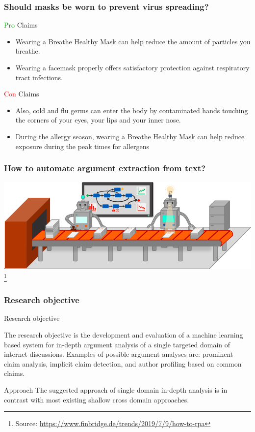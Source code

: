\documentclass{beamer}
\newcommand{\pro}[1]{\textcolor{green}{#1}}
\newcommand{\con}[1]{\textcolor{red}{#1}}
\begin{document}
\begin{frame}
\frametitle{Should masks be worn to prevent virus spreading?}
\begin{block}{\pro{Pro} Claims}
\begin{itemize}
	\item Wearing a Breathe Healthy Mask can help reduce the amount of particles you breathe.
	\item Wearing a facemask properly offers satisfactory protection against respiratory tract infections.
\end{itemize}
\end{block}

\begin{block}{\con{Con} Claims}
\begin{itemize}
	\item Also, cold and flu germs can enter the body by contaminated hands touching the corners of your eyes, your lips and your inner nose.
	\item During the allergy season, wearing a Breathe Healthy Mask can help reduce exposure during the peak times for allergens
\end{itemize}
\end{block}

\end{frame}

\begin{frame}
\frametitle{How to automate argument extraction from text?}
\includegraphics[scale=0.3]{assembly_line.png}
\footnote{
\tiny{Source: \url{https://www.finbridge.de/trends/2019/7/9/how-to-rpa}}}
\end{frame}

\begin{frame}
	\frametitle{Research objective}
	\begin{block}{Research objective}
		
The research objective is the development and evaluation of a machine learning
based system for in-depth argument analysis of a single targeted domain of
internet discussions. Examples of possible argument analyses are: prominent
claim analysis, implicit claim detection, and author profiling based on common claims. 
\end{block}

\begin{block}{Approach}
The suggested approach of single domain in-depth analysis is in contrast
with most existing shallow cross domain approaches. 
\end{block}

\end{frame}
\end{document}
